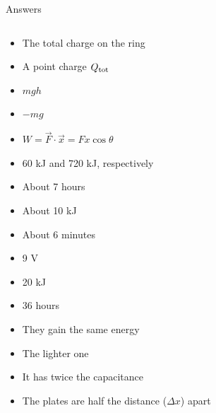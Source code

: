 \documentclass{beamer}
\begin{document}
\begin{frame}{Answers}
\begin{columns}[T]
\begin{column}{0.5\textwidth}
\begin{itemize}
\item The total charge on the ring
\item A point charge $Q_{\rm tot}$
\item $mgh$
\item $-mg$
\item $W = \vec{F} \cdot \vec{x} = Fx\cos\theta$
\item 60 kJ and 720 kJ, respectively
\item About 7 hours
\item About 10 kJ
\item About 6 minutes
\item 9 V
\item 20 kJ
\item 36 hours
\item They gain the same energy
\item The lighter one
\item It has twice the capacitance
\item The plates are half the distance ($\Delta x$) apart
\end{itemize}
\end{column}
\end{columns}
\end{frame}
\end{document}
